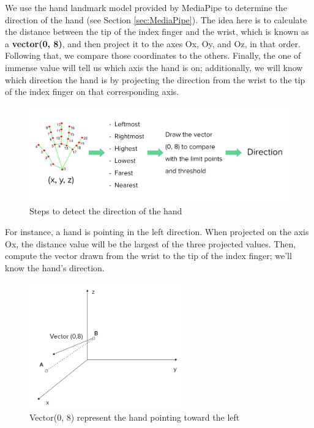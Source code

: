 We use the hand landmark model provided by MediaPipe to determine the direction of the hand (see Section \ref{sec:MediaPipe}). The idea here is to calculate the distance between the tip of the index finger and the wrist, which is known as a \textbf{vector(0, 8)}, and then project it to the axes Ox, Oy, and Oz, in that order. Following that, we compare those coordinates to the others. Finally, the one of immense value will tell us which axis the hand is on; additionally, we will know which direction the hand is by projecting the direction from the wrist to the tip of the index finger on that corresponding axis.

\begin{figure}[H]
	\centering
	\includegraphics[width=\textwidth]{img/Chap4/DirectionSteps.png}
	\caption{Steps to detect the direction of the hand}
	\label{fig:Chap4-DirectionSteps}
\end{figure}

For instance, a hand is pointing in the left direction. When projected on the axis Ox, the distance value will be the largest of the three projected values. Then, compute the vector drawn from the wrist to the tip of the index finger; we'll know the hand's direction.

\begin{figure}[H]
	\centering
	\includegraphics[width=0.6\textwidth]{img/Chap4/vector0-8-forwardLeft.png}
	\caption{Vector(0, 8) represent the hand pointing toward the left}
	\label{fig:Chap4-vector0-8-forwardLeft}
\end{figure}

